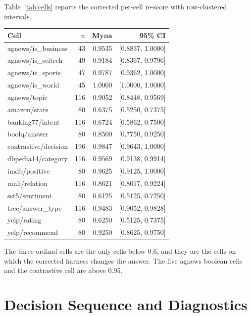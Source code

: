 Table~\ref{tab:cells} reports the corrected per-cell re-score with row-clustered intervals.

\begin{widetable}
\centering
\footnotesize
\caption{Per-cell corrected re-score with row-clustered 95\% intervals (5{,}000 replicates for the per-cell intervals; 20{,}000 for the macro intervals, seed
20261104). The interval is on the cell accuracy; the unit resampled is the row, not the question.}
\label{tab:cells}
\begin{tabular}{lrrr}
\toprule
Cell & $n$ & Myna & 95\% CI \\
\midrule
agnews/is\_business & 43 & 0.9535 & [0.8837, 1.0000] \\
agnews/is\_scitech & 49 & 0.9184 & [0.8367, 0.9796] \\
agnews/is\_sports & 47 & 0.9787 & [0.9362, 1.0000] \\
agnews/is\_world & 45 & 1.0000 & [1.0000, 1.0000] \\
agnews/topic & 116 & 0.9052 & [0.8448, 0.9569] \\
amazon/stars & 80 & 0.6375 & [0.5250, 0.7375] \\
banking77/intent & 116 & 0.6724 & [0.5862, 0.7500] \\
boolq/answer & 80 & 0.8500 & [0.7750, 0.9250] \\
contrastive/decision & 196 & 0.9847 & [0.9643, 1.0000] \\
dbpedia14/category & 116 & 0.9569 & [0.9138, 0.9914] \\
imdb/positive & 80 & 0.9625 & [0.9125, 1.0000] \\
mnli/relation & 116 & 0.8621 & [0.8017, 0.9224] \\
sst5/sentiment & 80 & 0.6125 & [0.5125, 0.7250] \\
trec/answer\_type & 116 & 0.9483 & [0.9052, 0.9828] \\
yelp/rating & 80 & 0.6250 & [0.5125, 0.7375] \\
yelp/recommend & 80 & 0.9250 & [0.8625, 0.9750] \\
\bottomrule
\end{tabular}
\end{widetable}

The three ordinal cells are the only cells below 0.6, and they are the cells on which the corrected
harness changes the answer. The five agnews boolean cells and the contrastive cell are above 0.95.

\section{Decision Sequence and Diagnostics}
\label{app:sequence}

